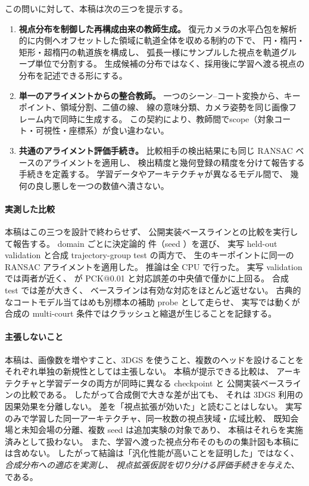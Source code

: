 この問いに対して、本稿は次の三つを提示する。

\begin{enumerate}[leftmargin=1.6em]
  \item \textbf{視点分布を制御した再構成由来の教師生成。}
  復元カメラの水平凸包を解析的に内側へオフセットした領域に軌道全体を収める制約の下で、
  円・楕円・矩形・超楕円の軌道族を構成し、
  弧長一様にサンプルした視点を軌道グループ単位で分割する。
  生成候補の分布ではなく、採用後に学習へ渡る視点の分布を記述できる形にする。

  \item \textbf{単一のアライメントからの整合教師。}
  一つのシーン--コート変換から、キーポイント、領域分割、二値の線、
  線の意味分類、カメラ姿勢を同じ画像フレーム内で同時に生成する。
  この契約により、教師間でscope（対象コート・可視性・座標系）が食い違わない。

  \item \textbf{共通のアライメント評価手続き。}
  比較相手の検出結果にも同じ RANSAC ベースのアライメントを適用し、
  検出精度と幾何登録の精度を分けて報告する手続きを定義する。
  学習データやアーキテクチャが異なるモデル間で、
  幾何の良し悪しを一つの数値へ潰さない。
\end{enumerate}

\paragraph{実測した比較}
本稿はこの三つを設計で終わらせず、
公開実装ベースラインとの比較を実行して報告する。
domain ごとに決定論的 \resBenchDomainSamples 件（seed \resBenchSeed）を選び、
実写 held-out validation と合成 trajectory-group test の両方で、
生のキーポイントに同一の RANSAC アライメントを適用した。
推論は全 CPU で行った。
実写 validation では両者が近く、
\Method が PCK@0.01 と対応誤差の中央値で僅かに上回る。
合成 test では差が大きく、
ベースラインは有効な対応をほとんど返せない。
古典的なコートモデル当てはめも別標本の補助 probe として走らせ、
実写では動くが合成の multi-court 条件ではクラッシュと縮退が生じることを記録する。

\paragraph{主張しないこと}
本稿は、画像数を増やすこと、3DGS を使うこと、複数のヘッドを設けることを
それぞれ単独の新規性としては主張しない。
本稿が提示できる比較は、
アーキテクチャと学習データの両方が同時に異なる checkpoint と
公開実装ベースラインの比較である。
したがって合成側で大きな差が出ても、
それは 3DGS 利用の因果効果を分離しない。
差を「視点拡張が効いた」と読むことはしない。
実写のみで学習した同一アーキテクチャ、同一枚数の視点狭域・広域比較、
既知会場と未知会場の分離、複数 seed は追加実験の対象であり、
本稿はそれらを実施済みとして扱わない。
また、学習へ渡った視点分布そのものの集計図も本稿には含めない。
したがって結論は「汎化性能が高いことを証明した」ではなく、
\emph{合成分布への適応を実測し、
視点拡張仮説を切り分ける評価手続きを与えた}、である。

